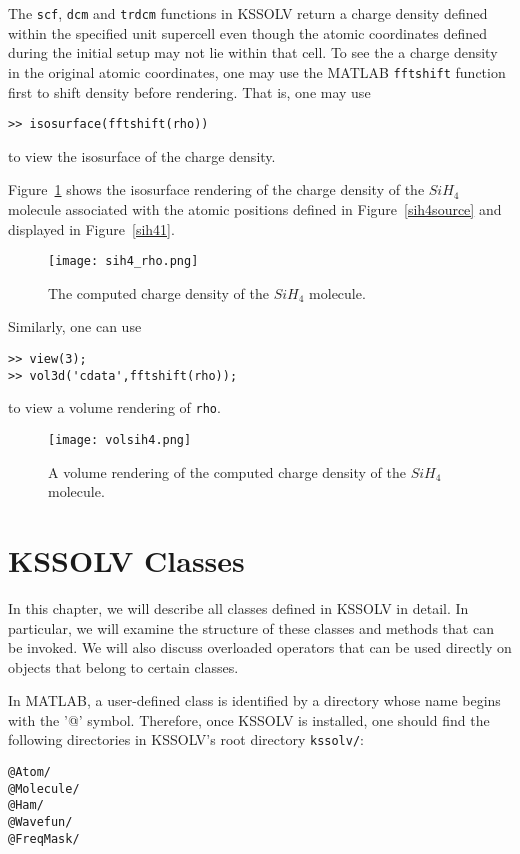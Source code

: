 \documentclass[11pt]{book}
\begin{document}
The {\tt scf}, {\tt dcm} and {\tt trdcm} functions in KSSOLV return
a charge density defined within the specified unit supercell even 
though the atomic coordinates defined during the initial setup may 
not lie within that cell.  To see the a charge density in the original 
atomic coordinates, one may use the MATLAB {\tt fftshift} function first
to shift density before rendering. That is, one may use
\begin{verbatim}
>> isosurface(fftshift(rho))
\end{verbatim}
to view the isosurface of the charge density.

Figure~\ref{sih4rho} shows the isosurface rendering of the charge density of
the $SiH_4$ molecule associated with the atomic positions defined in 
Figure~\ref{sih4source} and displayed in Figure~\ref{sih41}.
%
\begin{figure}[h!]
\begin{center}
\texttt{[image: sih4\_rho.png]}
\end{center}
\caption{The computed charge density of the $SiH_4$ molecule.}
\label{sih4rho}
\end{figure}
%
Similarly, one can use
\begin{verbatim}
>> view(3);
>> vol3d('cdata',fftshift(rho));
\end{verbatim}
to view a volume rendering of {\tt rho}.
\begin{figure}[h!]
\begin{center}
\texttt{[image: volsih4.png]}
\end{center}
\caption{A volume rendering of the computed charge density of the $SiH_4$ molecule.}
\label{sih4rhovr}
\end{figure}

\chapter{KSSOLV Classes} \label{chap:class}
In this chapter, we will describe all classes defined in KSSOLV in 
detail.  In particular, we will examine the structure of these classes and
methods that can be invoked. We will also discuss overloaded operators that 
can be used directly on objects that belong to certain classes.  

In MATLAB, a user-defined class is identified by a directory whose name 
begins with the '@' symbol.  Therefore, once KSSOLV is installed,
one should find the following directories in KSSOLV's root directory {\tt kssolv/}:
\begin{verbatim}
@Atom/
@Molecule/
@Ham/
@Wavefun/
@FreqMask/
\end{verbatim}
\end{document}
